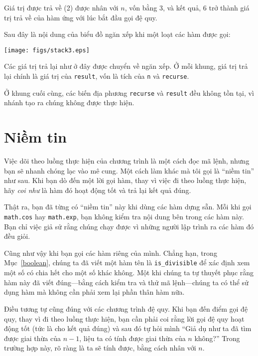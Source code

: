 \documentclass[11pt]{book}
\begin{document}
Giá trị được trả về (2) được nhân với $n$, vốn bằng 3, và kết quả, 6
trở thành giá trị trả về của hàm ứng với lúc bắt đầu gọi đệ quy.


Sau đây là nội dung của biểu đồ ngăn xếp khi một loạt các hàm được gọi:

\vspace{0.1in}
\beforefig
\centerline{\texttt{[image: figs/stack3.eps]}}
\afterfig
\vspace{0.1in}

Các giá trị trả lại như ở đây được chuyển về ngăn xếp. Ở mỗi khung, giá trị
trả lại chính là giá trị của {\tt result}, vốn là tích của {\tt n} và {\tt recurse}.


Ở khung cuối cùng, các biến địa phương {\tt recurse} và {\tt result} đều 
không tồn tại, vì nhánh tạo ra chúng không được thực hiện.


\section{Niềm tin}

Việc dõi theo luồng thực hiện của chương trình là một cách đọc
mã lệnh, nhưng bạn sẽ nhanh chóng lạc vào mê cung. Một cách làm
khác mà tôi gọi là ``niềm tin'' như sau. Khi bạn dò đến một lời gọi
hàm, thay vì việc đi theo luồng thực hiện, hãy {\em coi như} là 
hàm đó hoạt động tốt và trả lại kết quả đúng.

Thật ra, bạn đã từng có ``niềm tin'' này khi dùng các hàm dựng sẵn.
Mỗi khi gọi {\tt math.cos} hay {\tt math.exp}, bạn không kiểm tra
nội dung bên trong các hàm này. Bạn chỉ việc giả sử rằng chúng chạy được 
vì những người lập trình ra các hàm đó đều giỏi.

Cũng như vậy khi bạn gọi các hàm riêng của mình. Chẳng hạn, trong 
Mục~\ref{boolean}, chúng ta đã viết một hàm tên là \verb"is_divisible"
để xác định xem một số có chia hết cho một số khác không. Một khi
chúng ta tự thuyết phục rằng hàm này đã viết đúng---bằng cách kiểm
tra và thử mã lệnh---chúng ta có thể sử dụng hàm mà không cần
phải xem lại phần thân hàm nữa.


Điều tương tự cũng đúng với các chương trình đệ quy. Khi bạn đến điểm 
gọi đệ quy, thay vì đi theo luồng thực hiện, bạn cần phải coi rằng
lời gọi đệ quy hoạt động tốt (tức là cho kết quả đúng) và sau đó tự hỏi
mình ``Giả dụ như ta đã tìm được giai thừa của $n-1$, liệu ta có tính
được giai thừa của $n$ không?'' Trong trường hợp này, rõ ràng là ta
sẽ tính được, bằng cách nhân với $n$.
\end{document}
